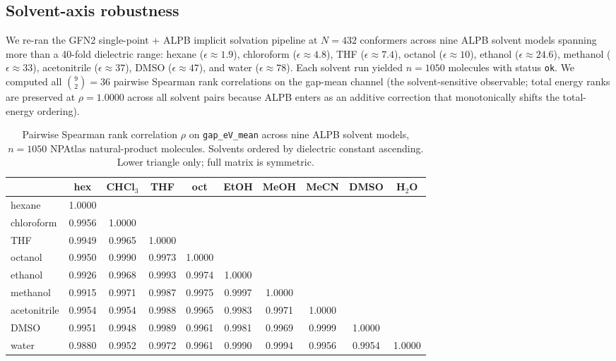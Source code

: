 \documentclass[11pt,a4paper]{article}
\begin{document}
\subsection{Solvent-axis robustness}
\label{sec:results-solvent}

We re-ran the GFN2 single-point + ALPB implicit solvation pipeline at
$N = 432$ conformers across nine ALPB solvent models spanning more
than a 40-fold dielectric range: hexane ($\epsilon \approx 1.9$),
chloroform ($\epsilon \approx 4.8$), THF ($\epsilon \approx 7.4$),
octanol ($\epsilon \approx 10$), ethanol ($\epsilon \approx 24.6$),
methanol ($\epsilon \approx 33$), acetonitrile ($\epsilon \approx 37$),
DMSO ($\epsilon \approx 47$), and water ($\epsilon \approx 78$).
Each solvent run yielded $n = 1050$ molecules with status \texttt{ok}.
We computed all $\binom{9}{2} = 36$ pairwise Spearman rank correlations
on the gap-mean channel (the solvent-sensitive observable; total
energy ranks are preserved at $\rho = 1.0000$ across all solvent pairs
because ALPB enters as an additive correction that monotonically
shifts the total-energy ordering).

\begin{table}[ht]
\centering
\caption{Pairwise Spearman rank correlation $\rho$ on
\texttt{gap\_eV\_mean} across nine ALPB solvent models, $n = 1050$
NPAtlas natural-product molecules. Solvents ordered by dielectric
constant ascending. Lower triangle only; full matrix is symmetric.}
\label{tab:solvent-rho}
\small
\begin{tabular}{lccccccccc}
\toprule
        & hex & CHCl$_3$ & THF & oct & EtOH & MeOH & MeCN & DMSO & H$_2$O \\
\midrule
hexane          & 1.0000 & & & & & & & & \\
chloroform      & 0.9956 & 1.0000 & & & & & & & \\
THF             & 0.9949 & 0.9965 & 1.0000 & & & & & & \\
octanol         & 0.9950 & 0.9990 & 0.9973 & 1.0000 & & & & & \\
ethanol         & 0.9926 & 0.9968 & 0.9993 & 0.9974 & 1.0000 & & & & \\
methanol        & 0.9915 & 0.9971 & 0.9987 & 0.9975 & 0.9997 & 1.0000 & & & \\
acetonitrile    & 0.9954 & 0.9954 & 0.9988 & 0.9965 & 0.9983 & 0.9971 & 1.0000 & & \\
DMSO            & 0.9951 & 0.9948 & 0.9989 & 0.9961 & 0.9981 & 0.9969 & 0.9999 & 1.0000 & \\
water           & 0.9880 & 0.9952 & 0.9972 & 0.9961 & 0.9990 & 0.9994 & 0.9956 & 0.9954 & 1.0000 \\
\bottomrule
\end{tabular}
\end{table}
\end{document}
